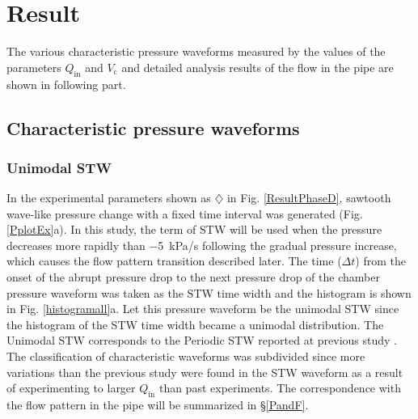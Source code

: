 \documentclass[aps,pre,preprint,groupedaddress,showkeys]{revtex4-2}
\begin{document}
\section{Result}\label{res}
The various characteristic pressure waveforms measured by the values of the parameters $Q_\mathrm{in}$ and $V_ \mathrm{c}$ and detailed analysis results of the flow in the pipe are shown in following part.
\subsection{Characteristic pressure waveforms}
\subsubsection{Unimodal STW}
In the experimental parameters shown as $\diamondsuit$ in Fig. \ref{ResultPhaseD}, sawtooth wave-like pressure change with a fixed time interval was generated (Fig. \ref{PplotEx}a).
In this study, the term of STW will be used when the pressure decreases more rapidly than \SI{-5}{kPa/s} following the gradual pressure increase, which causes the flow pattern transition described later.
The time ($\Delta t$) from the onset of the abrupt pressure drop to the next pressure drop of the chamber pressure waveform was taken as the STW time width and the histogram is shown in Fig. \ref {histogramall}a.
Let this pressure waveform be the unimodal STW since the histogram of the STW time width became a unimodal distribution.
The Unimodal STW corresponds to the Periodic STW reported at previous study \citep{kanno2018}.
The classification of characteristic waveforms was subdivided since more variations than the previous study were found in the STW waveform as a result of experimenting to larger $Q_\mathrm{in}$ than past experiments.
The correspondence with the flow pattern in the pipe will be summarized in \S \ref{PandF}.
\end{document}
